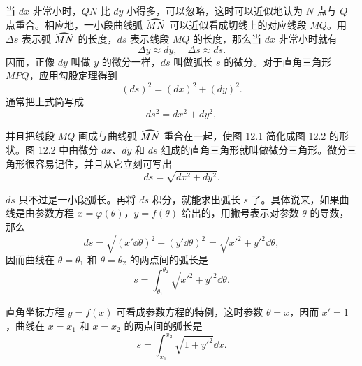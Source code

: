 当 $dx$ 非常小时，$QN$ 比 $dy$ 小得多，可以忽略，这时可以近似地认为 $N$ 点与 $Q$ 点重合。相应地，一小段曲线弧 $\arc{MN}$ 可以近似看成切线上的对应线段 $MQ$。用 $\Delta s$ 表示弧 $\arc{MN}$ 的长度，$ds$ 表示线段 $MQ$ 的长度，那么当 $dx$ 非常小时就有
\[
  \Delta y \approx dy,\quad \Delta s \approx ds.
\]
因而，正像 $dy$ 叫做 $y$ 的微分一样，$ds$ 叫做弧长 $s$ 的微分。对于直角三角形 $MPQ$，应用勾股定理得到
\[
  (ds)^2 = (dx)^2 + (dy)^2.
\]
通常把上式简写成
\[
  ds^2 = dx^2 + dy^2,
\]

\noindent
\begin{minipage}[c]{0.38\textwidth}
  \centering
\end{minipage}\hfill
\begin{minipage}[c]{0.58\textwidth}
  \noindent 并且把线段 $MQ$ 画成与曲线弧 $\arc{MN}$ 重合在一起，使图 12.1 简化成图 12.2 的形状。图 12.2 中由微分 $dx$、$dy$ 和 $ds$ 组成的直角三角形就叫做微分三角形。微分三角形很容易记住，并且从它立刻可写出
  \[
    ds = \sqrt{dx^2 + dy^2}.
  \]
\end{minipage}

$ds$ 只不过是一小段弧长。再将 $ds$ 积分，就能求出弧长 $s$ 了。具体说来，如果曲线是由参数方程 $x = \varphi(\theta)$，$y = f(\theta)$ 给出的，用撇号表示对参数 $\theta$ 的导数，那么
\[
  ds = \sqrt{(x'\dd\theta)^2 + (y'\dd\theta)^2} = \sqrt{x'^2 + y'^2}\dd\theta,
\]
因而曲线在 $\theta = \theta_1$ 和 $\theta = \theta_2$ 的两点间的弧长是
\[
  s = \int_{\theta_1}^{\theta_2} \sqrt{x'^2 + y'^2}\dd\theta.
\]

直角坐标方程 $y = f(x)$ 可看成参数方程的特例，这时参数 $\theta = x$，因而 $x' = 1$，曲线在 $x = x_1$ 和 $x = x_2$ 的两点间的弧长是
\[
  s = \int_{x_1}^{x_2} \sqrt{1 + y'^2}\dd x.
\]

